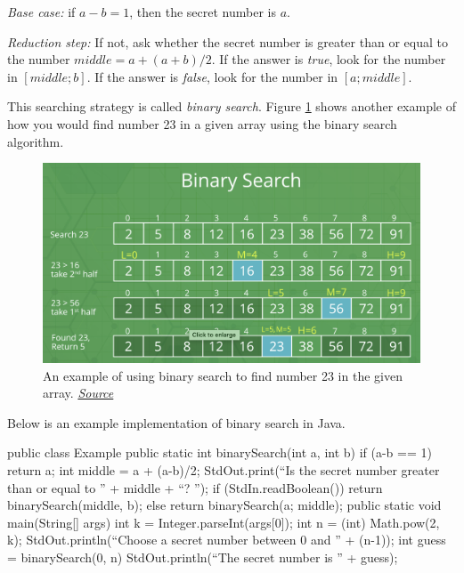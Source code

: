 \begin{itemsize}
\item \textit{Base case:} if $a-b = 1$, then the secret number is $a$.
\item \textit{Reduction step:} If not, ask whether the secret number is greater than or equal to the number $middle = a + (a+b)/2$. If the answer is \textit{true}, look for the number in  $[middle; b]$. If the answer is \textit{false}, look for the number in $[a; middle]$.
\end{itemsize}

This searching strategy is called \textit{binary search}. Figure \ref{fig:binary} shows another example of how you would find number 23 in a given array using the binary search algorithm.

\begin{figure}
    \centering
    \includegraphics[width=\textwidth]{lectures/images/binary.png}
    \caption{An example of using binary search to find number 23 in the given array. \href{https://www.geeksforgeeks.org/binary-search/}{\textit{Source}}}
    \label{fig:binary}
\end{figure}


Below is an example implementation of binary search in Java.

\begin{code}
public class Example
{
    public static int binarySearch(int a, int b)
	{
	if (a-b == 1) return a;
 	int middle = a + (a-b)/2;
	StdOut.print(“Is the secret number greater than or equal to ” + middle + “? ”);
	if (StdIn.readBoolean())
		return binarySearch(middle, b);
	else
		return binarySearch(a; middle);
	}
	public static void main(String[] args)
{
int k = Integer.parseInt(args[0]);
int n = (int) Math.pow(2, k);
StdOut.println(“Choose a secret number between 0 and ” + (n-1));
int guess = binarySearch(0, n)
StdOut.println(“The secret number is ” + guess);
}
}
\end{code}
 
